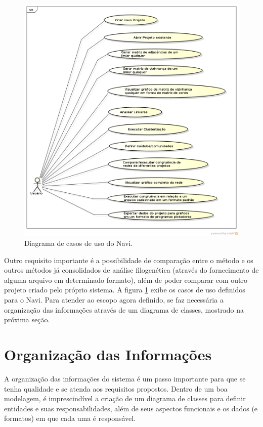 \begin{figure}
\centering
\includegraphics[scale=0.52]{diagrama-casos-de-uso}
\caption{Diagrama de casos de uso do Navi.}
\label{fig:casos-uso}
\end{figure}

Outro requisito importante é a possibilidade de comparação entre o método e os outros métodos já consolidados de análise filogenética (através do fornecimento
de alguma arquivo em determinado formato), além de poder comparar com outro projeto criado pelo próprio sistema. A figura \ref{fig:casos-uso} exibe os casos
de uso definidos para o Navi. Para atender ao escopo agora definido, se faz necessária a organização das informações através de um diagrama de classes,
mostrado na próxima seção.

\section{Organização das Informações} \label{sec:organizacao}

A organização das informações do sistema é um passo importante para que se tenha qualidade e se atenda aos requisitos propostos. Dentro de um boa modelagem,
é imprescindível a criação de um diagrama de classes para definir entidades e suas responsabilidades, além de seus aspectos funcionais e os dados (e formatos)
em que cada uma é responsável.

